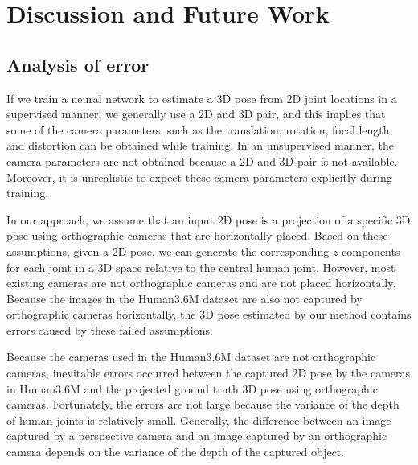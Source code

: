 \documentclass[runningheads]{llncs}
\newcommand{\matsui}[1]{\textbf{\textcolor{cyan}{[\textsc{MATSUI:} #1]}}}
\newcommand{\kudo}[1]{\textbf{\textcolor{blue}{[\textsc{KUDO:} #1]}}}
\begin{document}
\section{Discussion and Future Work}
\subsection{Analysis of error}
If we train a neural network to estimate a 3D pose from 2D joint locations in a supervised manner, we generally use a 2D and 3D pair, and this implies that some of the camera parameters, such as the translation, rotation, focal length, and distortion can be obtained while training.
In an unsupervised manner, the camera parameters are not obtained because a 2D and 3D pair is not available.
Moreover, it is unrealistic to expect these camera parameters explicitly during training.

In our approach, we assume that an input 2D pose is a projection of a specific 3D pose using orthographic cameras that are horizontally placed.
Based on these assumptions, given a 2D pose, we can generate the corresponding $z$-components for each joint in a 3D space relative to the central human joint.
However, most existing cameras are not orthographic cameras and are not placed horizontally.
Because the images in the Human3.6M dataset are also not captured by orthographic cameras horizontally, the 3D pose estimated by our method contains errors caused by these failed assumptions.

Because the cameras used in the Human3.6M dataset are not orthographic cameras, inevitable errors occurred between the captured 2D pose by the cameras in Human3.6M and the projected ground truth 3D pose using orthographic cameras.
Fortunately, the errors are not large because the variance of the depth of human joints is relatively small.
Generally, the difference between an image captured by a perspective camera and an image captured by an orthographic camera depends on the variance of the depth of the captured object.
\end{document}
